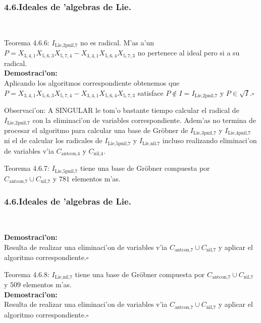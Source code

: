 \documentclass[10pt]{beamer}
\begin{document}
\begin{frame}
\frametitle{4.6.Ideales de 'algebras de Lie.}\\
\begin{block}{Teorema 4.6.6:}
$I_{\text{Lie,2pnil,}7}$ no es radical. M'as a'un $P=X_{3,4,1}X_{5,6,3}X_{5,7,4}-X_{3,4,1}X_{5,6,4}X_{5,7,3}$ no pertenece al ideal pero si a su radical.\\
\textbf{Demostraci'on:}\\
Aplicando los algoritmos correspondiente obtenemos que\\
$P=X_{3,4,1}X_{5,6,3}X_{5,7,4}-X_{3,4,1}X_{5,6,4}X_{5,7,3}$ satisface $P \not \in I=I_{\text{Lie,2pnil,}7}$ y $P \in \sqrt{I}$.\hfill $\square$\\
\end{block}
\begin{block}{Observaci'on:}
A SINGULAR le tom'o bastante tiempo calcular el radical de $I_{\text{Lie,2pnil,}7}$ con la eliminaci'on de variables correspondiente. Adem'as no termina de procesar el algoritmo para calcular una base de Gr\"obner de $I_{\text{Lie,3pnil,}7}$ y $I_{\text{Lie,4pnil,}7}$ ni el de calcular los radicales de $I_{\text{Lie,5pnil,}7}$ y $I_{\text{Lie,nil,}7}$ incluso realizando eliminaci'on de variables v'ia $C_{\text{antcon,}4}$ y $C_{\text{nil,}4}$.\\
\end{block}
\begin{block}{Teorema 4.6.7:}
$I_{\text{Lie,5pnil,}7}$ tiene una base de Gr\"obner compuesta por $C_{\text{antcon,}7} \cup C_{\text{nil,}7}$ y $781$ elementos m'as.\\
\end{block}
\end{frame}

\begin{frame}
\frametitle{4.6.Ideales de 'algebras de Lie.}\\
\begin{block}{}
\textbf{Demostraci'on:}\\
Resulta de realizar una eliminaci'on de variables v'ia $C_{\text{antcon,}7} \cup C_{\text{nil,}7}$ y aplicar el algoritmo correspondiente.\hfill $\square$\\
\end{block}
\begin{block}{Teorema 4.6.8:}
$I_{\text{Lie,nil,}7}$ tiene una base de Gr\"obner compuesta por $C_{\text{antcon,}7} \cup C_{\text{nil,}7}$ y $509$ elementos m'as.\\

\textbf{Demostraci'on:}\\
Resulta de realizar una eliminaci'on de variables v'ia $C_{\text{antcon,}7} \cup C_{\text{nil,}7}$ y aplicar el algoritmo correspondiente.\hfill $\square$\\
\end{block}
\vspace{5cm}
\end{frame}
\end{document}
